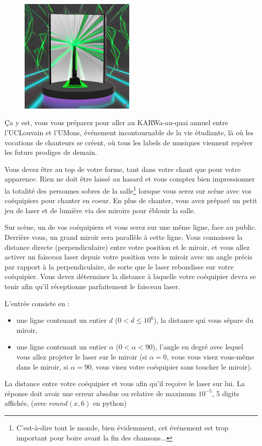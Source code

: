 \problemname{\problemyamlname}

\begin{figure}
    \centering
    \includegraphics[width=5.5cm]{mirror.jpg}
\end{figure}
Ça y est, vous vous préparez pour aller au KARWa-au-quai annuel entre l'UCLouvain et l'UMons, événement incontournable de la vie étudiante, là où les vocations de chanteurs se créent, où tous les labels de musiques viennent repérer les futurs prodiges de demain.

Vous devez être au top de votre forme, tant dans votre chant que pour votre apparence.
Rien ne doit être laissé au hasard et vous comptez bien impressionner la totalité des personnes sobres de la salle\footnote{C'est-à-dire tout le monde, bien évidemment, cet événement est trop important pour boire avant la fin des chansons...} lorsque vous serez sur scène avec vos coéquipiers pour chanter en coeur.
En plus de chanter, vous avez préparé un petit jeu de laser et de lumière via des miroirs pour éblouir la salle.

Sur scène, un de vos coéquipiers et vous serez sur une même ligne, face au public.
Derrière vous, un grand miroir sera parallèle à cette ligne.
Vous connaissez la distance directe (perpendiculaire) entre votre position et le miroir,
et vous allez activer un faisceau laser depuis votre position vers le miroir avec un angle
précis par rapport à la perpendiculaire, de sorte que le laser rebondisse sur votre coéquipier.
Vous devez déterminer la distance à laquelle votre coéquipier devra se tenir afin qu'il réceptionne parfaitement le faisceau laser.

\begin{Input}
	L'entrée consiste en :
	\begin{itemize}
		\item une ligne contenant un entier $d$ ($0 < d \le 10^6$), la distance qui vous sépare du miroir,
		\item une ligne contenant un entier $\alpha$ ($0 < \alpha < 90$), l'angle en degré avec lequel vous allez projeter le laser sur le miroir (si $\alpha=0$, vous vous visez vous-même dans le miroir, si $\alpha=90$, vous visez votre coéquipier sans toucher le miroir).
	\end{itemize}
\end{Input}

\begin{Output}
	La distance entre votre coéquipier et vous afin qu'il reçoive le laser sur lui.
	La réponse doit avoir une erreur absolue ou relative de maximum $10^{-5}$, 5 digits affichés, (avec $round(x,6)$ en python)
\end{Output}
